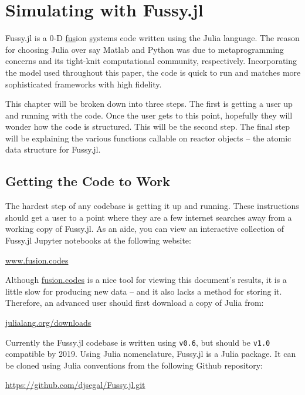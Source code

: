 \chapter{Simulating with Fussy.jl}

\label{chapter:fussy}

Fussy.jl is a 0-D \underline{fus}ion \underline{sy}stems code written using the Julia language. The reason for choosing Julia over say Matlab and Python was due to metaprogramming concerns and its tight-knit  computational community, respectively. Incorporating the model used throughout this paper, the code is quick to run and matches more sophisticated frameworks with high fidelity.

This chapter will be broken down into three steps. The first is getting a user up and running with the code. Once the user gets to this point, hopefully they will wonder how the code is structured. This will be the second step. The final step will be explaining the various functions callable on reactor objects -- the atomic data structure for Fussy.jl.

\section{Getting the Code to Work}

The hardest step of any codebase is getting it up and running. These instructions should get a user to a point where they are a few internet searches away from a working copy of Fussy.jl. As an aide, you can view an interactive collection of Fussy.jl Jupyter notebooks at the following website:

{\centering \href{http://fusion.codes}{www.fusion.codes} \par }

Although \href{http://fusion.codes}{fusion.codes} is a nice tool for viewing this document's results, it is a little slow for producing new data -- and it also lacks a method for storing it. Therefore, an advanced user should first download a copy of Julia from:

{\centering \href{https://julialang.org/downloads}{julialang.org/downloads} \par }

Currently the Fussy.jl codebase is written using \texttt{v0.6}, but should be \texttt{v1.0} compatible by 2019. Using Julia nomenclature, Fussy.jl is a Julia package. It can be cloned using Julia conventions from the following Github repository:

{\centering \href{https://github.com/djsegal/Fussy.jl.git}{https://github.com/djsegal/Fussy.jl.git} \par }

